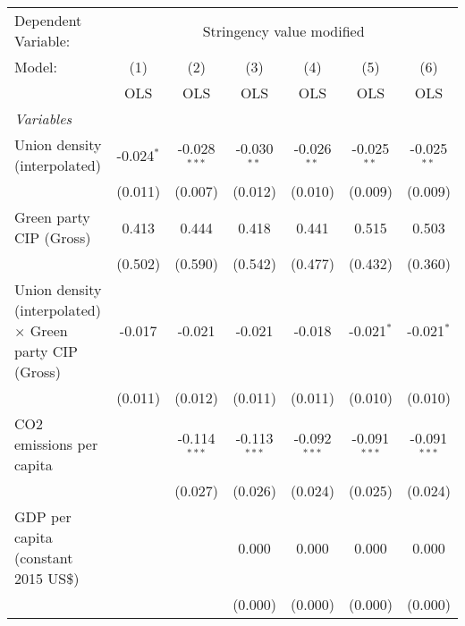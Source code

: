 
\begingroup
\centering
\begin{tabular}{lcccccc}
   \toprule
   Dependent Variable: & \multicolumn{6}{c}{Stringency value modified}\\
   Model:                                                         & (1)          & (2)            & (3)            & (4)            & (5)            & (6)\\  
                                                                  &  OLS         & OLS            & OLS            & OLS            & OLS            & OLS\\  
   \midrule
   \emph{Variables}\\
   Union density (interpolated)                                   & -0.024$^{*}$ & -0.028$^{***}$ & -0.030$^{**}$  & -0.026$^{**}$  & -0.025$^{**}$  & -0.025$^{**}$\\   
                                                                  & (0.011)      & (0.007)        & (0.012)        & (0.010)        & (0.009)        & (0.009)\\   
   Green party CIP (Gross)                                        & 0.413        & 0.444          & 0.418          & 0.441          & 0.515          & 0.503\\   
                                                                  & (0.502)      & (0.590)        & (0.542)        & (0.477)        & (0.432)        & (0.360)\\   
   Union density (interpolated) $\times$ Green party CIP (Gross)  & -0.017       & -0.021         & -0.021         & -0.018         & -0.021$^{*}$   & -0.021$^{*}$\\   
                                                                  & (0.011)      & (0.012)        & (0.011)        & (0.011)        & (0.010)        & (0.010)\\   
   CO2 emissions per capita                                       &              & -0.114$^{***}$ & -0.113$^{***}$ & -0.092$^{***}$ & -0.091$^{***}$ & -0.091$^{***}$\\   
                                                                  &              & (0.027)        & (0.026)        & (0.024)        & (0.025)        & (0.024)\\   
   GDP per capita (constant 2015 US\$)                            &              &                & 0.000          & 0.000          & 0.000          & 0.000\\   
                                                                  &              &                & (0.000)        & (0.000)        & (0.000)        & (0.000)\\   

\end{tabular}
